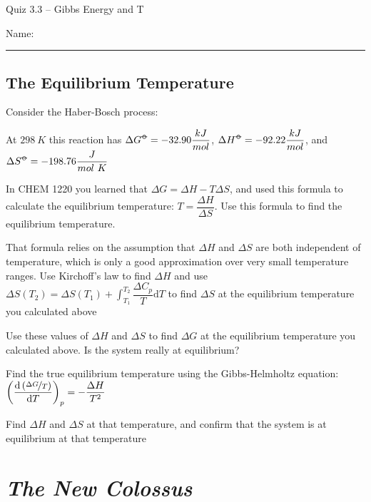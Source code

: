 \documentclass[11pt, letterpaper]{memoir}
\begin{document}
	\begin{center}
		{\large Quiz 3.3 -- Gibbs Energy and T}
	\end{center}
	{\large Name: \rule[-1mm]{4in}{.1pt} 
		
\subsection*{The Equilibrium Temperature}


\noindent
Consider the Haber-Bosch process: 

\noindent At $298~K$ this reaction has $\Delta G^{\std} = -32.90\dfrac{kJ}{mol}$, $\Delta H^{\std}= -92.22 \dfrac{kJ}{mol}$, and $\Delta S^{\std}= -198.76\dfrac{J}{mol~K}$

\noindent In CHEM 1220 you learned that $\Delta G=\Delta H-T\Delta S$, and used this formula to calculate the equilibrium temperature: $T=\dfrac{\Delta H}{\Delta S}$. Use this formula to find the equilibrium temperature.

\vspace{3em}\noindent
That formula relies on the assumption that $\Delta H$ and $\Delta S$ are both independent of temperature, which is only a good approximation over very small temperature ranges. Use Kirchoff's law to find $\Delta H$ and use $\Delta S(T_2)=\Delta S(T_1) + \displaystyle\int_{T_1}^{T_2}\dfrac{\Delta C_p}{T}\mathrm{d}T$ to find $\Delta S$ at the equilibrium temperature you calculated above

\vspace{8em}\noindent
Use these values of $\Delta H$ and $\Delta S$ to find $\Delta G$ at the equilibrium temperature you calculated above. Is the system really at equilibrium?

\vspace{3em}\noindent
Find the true equilibrium temperature using the Gibbs-Helmholtz equation: $\left(\dfrac{\mathrm{d}\left(\nicefrac{\Delta G}{T}\right)}{\mathrm{d}T}\right)_p=-\dfrac{\Delta H}{T^2}$


\vspace{7em}\noindent
Find $\Delta H$ and $\Delta S$ at that temperature, and confirm that the system is at equilibrium at that temperature
\newpage
\pagestyle{empty}
\addtocounter{page}{-1}
\section*{\emph{The New Colossus}}
}
\end{document}
